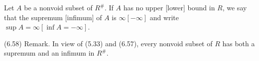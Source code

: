 Let $A$ be a nonvoid subset of $R^\#$. If $A$ has no upper [lower] bound in $R$, we say that the supremum [infimum] of $A$ is $\infty [-\infty]$ and write $\sup A = \infty [\inf A = -\infty]$.

(6.58) Remark. In view of (5.33) and (6.57), every nonvoid subset of $R$ has both a supremum and an infimum in $R^\#$.